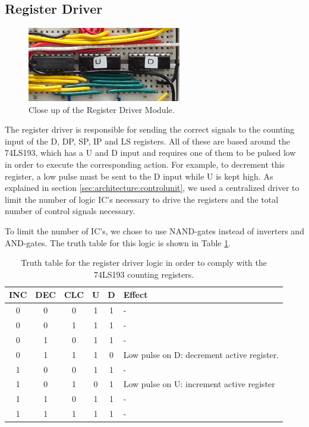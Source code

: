 
\subsection{Register Driver} \label{sec:implementation:registerdriver}
\begin{figure}[H]
  \centering
  \includegraphics[width=0.6\textwidth]{img/registerdrivercloseup}
  \caption{Close up of the Register Driver Module.}
  \label{fig:registerdrivercloseup}
\end{figure}
The register driver is responsible for sending the correct signals to the counting input of the D, DP, SP, IP and LS registers. All of these are based around the 74LS193, which has a U and D input and requires one of them to be pulsed low in order to execute the corresponding action. For example, to decrement this register, a low pulse must be sent to the D input while U is kept high. As explained in section \ref{sec:architecture:controlunit}, we used a centralized driver to limit the number of logic IC's necessary to drive the registers and the total number of control signals necessary.

To limit the number of IC's, we chose to use NAND-gates instead of inverters and AND-gates. The truth table for this logic is shown in Table \ref{tab:registerdrivertruth}.

\begin{table}[h]
  \centering
  \begin{tabular}{ccc|cc|l}
    INC & DEC & CLC & U & D & Effect \\ \hline
    0   & 0   & 0   & 1 & 1 & - \\
    0   & 0   & 1   & 1 & 1 & - \\
    0   & 1   & 0   & 1 & 1 & - \\
    0   & 1   & 1   & 1 & 0 & Low pulse on D: decrement active register. \\
    1   & 0   & 0   & 1 & 1 & - \\
    1   & 0   & 1   & 0 & 1 & Low pulse on U: increment active register \\
    1   & 1   & 0   & 1 & 1 & - \\
    1   & 1   & 1   & 1 & 1 & - \\
  \end{tabular}
  \caption{Truth table for the register driver logic in order to comply with the 74LS193 counting registers.}
  \label{tab:registerdrivertruth}
\end{table}

